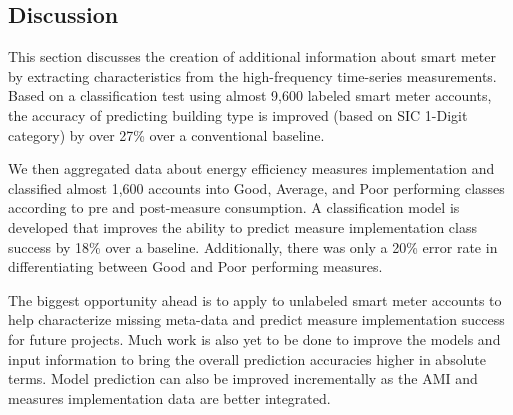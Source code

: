 \subsection{Discussion}
\label{sec:scalabilitydiscussion}

This section discusses the creation of additional information about smart meter by extracting characteristics from the high-frequency time-series measurements. Based on a classification test using almost 9,600 labeled smart meter accounts, the accuracy of predicting building type is improved (based on SIC 1-Digit category) by over 27\% over a conventional baseline. 

We then aggregated data about energy efficiency measures implementation and classified almost 1,600 accounts into Good, Average, and Poor performing classes according to pre and post-measure consumption. A classification model is developed that improves the ability to predict measure implementation class success by 18\% over a baseline. Additionally, there was only a 20\% error rate in differentiating between Good and Poor performing measures.

The biggest opportunity ahead is to apply to unlabeled smart meter accounts to help characterize missing meta-data and predict measure implementation success for future projects. Much work is also yet to be done to improve the models and input information to bring the overall prediction accuracies higher in absolute terms. Model prediction can also be improved incrementally as the AMI and measures implementation data are better integrated. 



